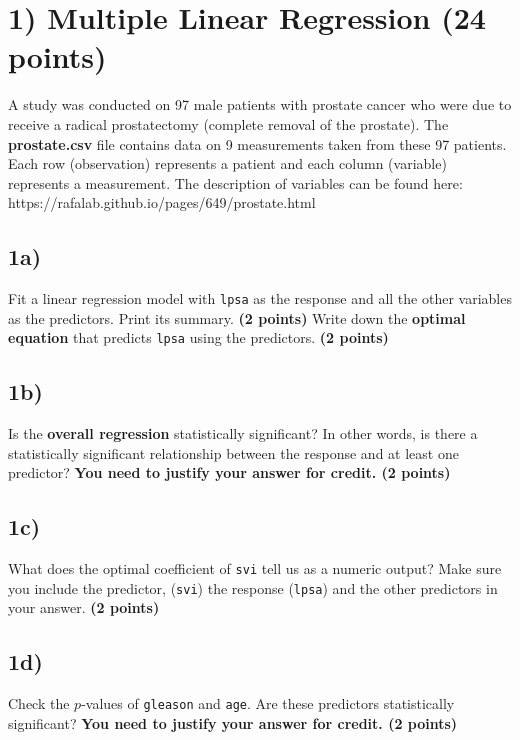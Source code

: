 \documentclass[
  letterpaper,
  DIV=11,
  numbers=noendperiod]{scrreprt}
\begin{document}
\section{1) Multiple Linear Regression (24
points)}\label{multiple-linear-regression-24-points}

A study was conducted on 97 male patients with prostate cancer who were
due to receive a radical prostatectomy (complete removal of the
prostate). The \textbf{prostate.csv} file contains data on 9
measurements taken from these 97 patients. Each row (observation)
represents a patient and each column (variable) represents a
measurement. The description of variables can be found here:
https://rafalab.github.io/pages/649/prostate.html

\subsection{1a)}\label{a-5}

Fit a linear regression model with \texttt{lpsa} as the response and all
the other variables as the predictors. Print its summary. \textbf{(2
points)} Write down the \textbf{optimal equation} that predicts
\texttt{lpsa} using the predictors. \textbf{(2 points)}

\subsection{1b)}\label{b-5}

Is the \textbf{overall regression} statistically significant? In other
words, is there a statistically significant relationship between the
response and at least one predictor? \textbf{You need to justify your
answer for credit. (2 points)}

\subsection{1c)}\label{c-3}

What does the optimal coefficient of \texttt{svi} tell us as a numeric
output? Make sure you include the predictor, (\texttt{svi}) the response
(\texttt{lpsa}) and the other predictors in your answer. \textbf{(2
points)}

\subsection{1d)}\label{d-2}

Check the \(p\)-values of \texttt{gleason} and \texttt{age}. Are these
predictors statistically significant? \textbf{You need to justify your
answer for credit. (2 points)}
\end{document}
